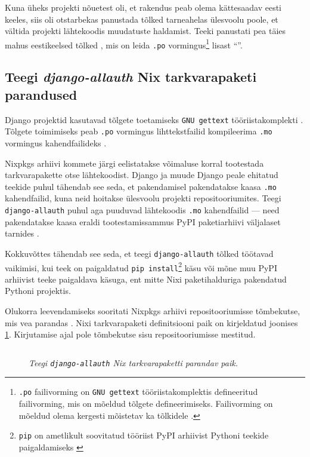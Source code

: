 Kuna üheks projekti nõuetest oli, et rakendus peab olema kättesaadav eesti keeles, siis oli otstarbekas panustada tõlked tarneahelas ülesvoolu poole, et vältida projekti lähtekoodis muudatuste haldamist. Teeki panustati pea täies mahus eestikeelsed tõlked \cite{django-allauth-et-i18n-pr}, mis on leida \texttt{.po} vormingus\footnote{\texttt{.po} failivorming on \texttt{GNU gettext} tööriistakomplektis defineeritud failivorming, mis on mõeldud tõlgete defineerimiseks. Failivorming on mõeldud olema kergesti mõistetav ka tõlkidele \cite{gnu-gettext-po}.} lisast ``''.

\subsection{Teegi \textit{django-allauth} Nix tarkvarapaketi parandused}\label{subsec:compile-mo}

Django projektid kasutavad tõlgete toetamiseks \texttt{GNU gettext} tööriistakomplekti \cite{django-gettext}. Tõlgete toimimiseks peab \texttt{.po} vormingus lihttekstfailid kompileerima \texttt{.mo} vormingus kahendfailideks \cite{django-gettext}.

Nixpkgs arhiivi kommete järgi eelistatakse võimaluse korral tootestada tarkvarapakette otse lähtekoodist. Django ja muude Django peale ehitatud teekide puhul tähendab see seda, et pakendamisel pakendatakse kaasa \texttt{.mo} kahendfailid, kuna neid hoitakse ülesvoolu projekti repositooriumites. Teegi \texttt{django-allauth} puhul aga puuduvad lähtekoodis \texttt{.mo} kahendfailid — need pakendatakse kaasa eraldi tootestamissammus PyPI paketiarhiivi väljalaset tarnides \cite{django-allauth-no-mo-files}.

Kokkuvõttes tähendab see seda, et teegi \texttt{django-allauth} tõlked töötavad vaikimisi, kui teek on paigaldatud \texttt{pip install}\footnote{\texttt{pip} on ametlikult soovitatud tööriist PyPI arhiivist Pythoni teekide paigaldamiseks \cite{pip-standard}} käsu või mõne muu PyPI arhiivist teeke paigaldava käsuga, ent mitte Nixi paketihalduriga pakendatud Pythoni projektis.

Olukorra leevendamiseks sooritati Nixpkgs arhiivi repositooriumisse tõmbekutse, mis vea parandas \cite{nixpkgs-compile-mo}. Nixi tarkvarapaketi definitsiooni paik on kirjeldatud joonises \ref{fig:compile-mo-patch}. Kirjutamise ajal pole tõmbekutse sisu repositooriumisse mestitud. 

\begin{figure}
\inputminted[breaklines]{diff}{chapters/data/compile-mo.diff}
\caption{\emph{Teegi \texttt{django-allauth} Nix tarkvarapaketti parandav paik.}}\label{fig:compile-mo-patch}
\end{figure}

